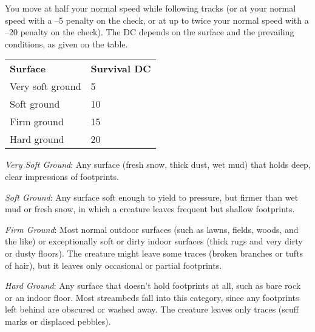 You move at half your normal speed while following tracks (or at your normal speed with a --5 penalty on the check, or at up to twice your normal speed with a --20 penalty on the check). The DC depends on the surface and the prevailing conditions, as given on the table.
\begin{table}
 \sffamily
 \begin{tabular}{ll}
\textbf{Surface} & \textbf{Survival DC}\\
Very soft ground & 5\\
Soft ground & 10\\
Firm ground & 15\\
Hard ground & 20\\
 \end{tabular}

\end{table}


				
\textit{Very Soft Ground}: Any surface (fresh snow, thick dust, wet mud) that holds deep, clear impressions of footprints.
				
\textit{Soft Ground}: Any surface soft enough to yield to pressure, but firmer than wet mud or fresh snow, in which a creature leaves frequent but shallow footprints.
				
\textit{Firm Ground}: Most normal outdoor surfaces (such as lawns, fields, woods, and the like) or exceptionally soft or dirty indoor surfaces (thick rugs and very dirty or dusty floors). The creature might leave some traces (broken branches or tufts of hair), but it leaves only occasional or partial footprints.
				
\textit{Hard Ground}: Any surface that doesn't hold footprints at all, such as bare rock or an indoor floor. Most streambeds fall into this category, since any footprints left behind are obscured or washed away. The creature leaves only traces (scuff marks or displaced pebbles). 

